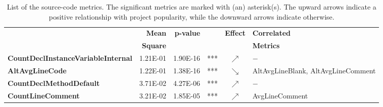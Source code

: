 \begin{sidewaystable}
	\scriptsize
	\tabcolsep=0.1cm
\centering
\caption{List of the source-code metrics. The significant metrics are marked with (an) asterisk(s). The upward arrows indicate a positive relationship with project popularity, while the downward arrows indicate otherwise.}
\label{table:RQ3}
	\begin{tabularx}{\columnwidth}{>{\bfseries}lrrlcl}
	\toprule
	\multirow{2}{*}{Metric} & \textbf{Mean}  & \multirow{2}{*}{\textbf{p-value}}  &     & \multirow{2}{*}{\textbf{Effect}}     &\textbf{Correlated}\\
	&\textbf{Square}&& &&\textbf{Metrics} \\
	\midrule	\midrule
CountDeclInstanceVariableInternal          & 1.21E-01 & 1.90E-16 & *** & $\nearrow$ &             $-$                                                                                                                                                                                                                                                                                                                                                     \\
AltAvgLineCode                             & 1.22E-01 & 1.38E-16 & *** & $\searrow$ & AltAvgLineBlank, AltAvgLineComment                                                                                                                                                                                                                                                                                                                              \\
CountDeclMethodDefault                     & 3.71E-02 & 4.27E-06 & *** & $\nearrow$ &               $-$                                                                                                                                                                                                                                                                                                                                                   \\
CountLineComment                           & 3.21E-02 & 1.85E-05 & *** & $\nearrow$ & AvgLineComment                                                                                                                                                                                                                                                                                                                                                  \\

\end{tabularx}
\end{sidewaystable}
